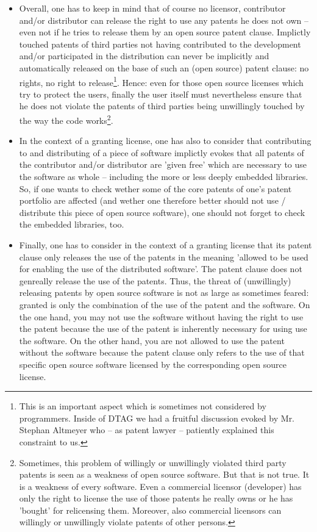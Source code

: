 \begin{itemize}
  
  \item Overall, one has to keep in mind that of course no licensor, contributor
  and/or distributor can release the right to use any patents he does not own --
  even not if he tries to release them by an open source patent clause.
  Implictly touched patents of third parties not having contributed to the
  development and/or participated in the distribution can never be implicitly
  and automatically released on the base of such an (open source) patent clause:
  no rights, no right to release\footnote{This is an important aspect which is
  sometimes not considered by programmers. Inside of DTAG we had a fruitful
  discussion evoked by Mr. Stephan Altmeyer who -- as patent lawyer -- patiently
  explained this constraint to us.}. Hence: even for those open source licenses
  which try to protect the users, finally the user itself must nevertheless
  ensure that he does not violate the patents of third parties being unwillingly
  touched by the way the code works\footnote{Sometimes, this problem of
  willingly or unwillingly violated third party patents is seen as a weakness of
  open source software. But that is not true. It is a weakness of every
  software. Even a commercial licensor (developer) has only the right to license
  the use of those patents he really owns or he has 'bought' for relicensing
  them. Moreover, also commercial licensors can willingly or unwillingly violate
  patents of other persons.}.
  
  \item In the context of a granting license, one has also to consider that
  contributing to and distributing of a piece of software implictly evokes that
  all patents of the contributor and/or distributor are 'given free' which are
  necessary to use the software as whole -- including the more or less deeply
  embedded libraries. So, if one wants to check wether some of the core patents
  of one's patent portfolio are affected (and wether one therefore better should
  not use / distribute this piece of open source software), one should not
  forget to check the embedded libraries, too.
  
  \item Finally, one has to consider in the context of a granting license that
  its patent clause only releases the use of the patents in the meaning 'allowed
  to be used for enabling the use of the distributed software'. The patent
  clause does not genreally release the use of the patents. Thus, the threat of
  (unwillingly) releasing patents by open source software is not as large as
  sometimes feared: granted is only the combination of the use of the patent and
  the software. On the one hand, you may not use the software without having the
  right to use the patent because the use of the patent is inherently necessary
  for using use the software. On the other hand, you are not allowed to use the
  patent without the software because the patent clause only refers to the use
  of that specific open source software licensed by the corresponding open
  source license.


\end{itemize}
